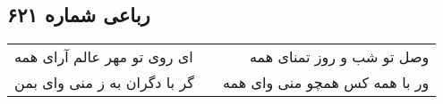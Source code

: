 \begin{center}
\section*{رباعی شماره ۶۲۱}
\label{sec:sh621}
\begin{longtable}{l p{0.5cm} r}
ای روی تو مهر عالم آرای همه
&&
وصل تو شب و روز تمنای همه
\\
گر با دگران به ز منی وای بمن
&&
ور با همه کس همچو منی وای همه
\\
\end{longtable}
\end{center}
